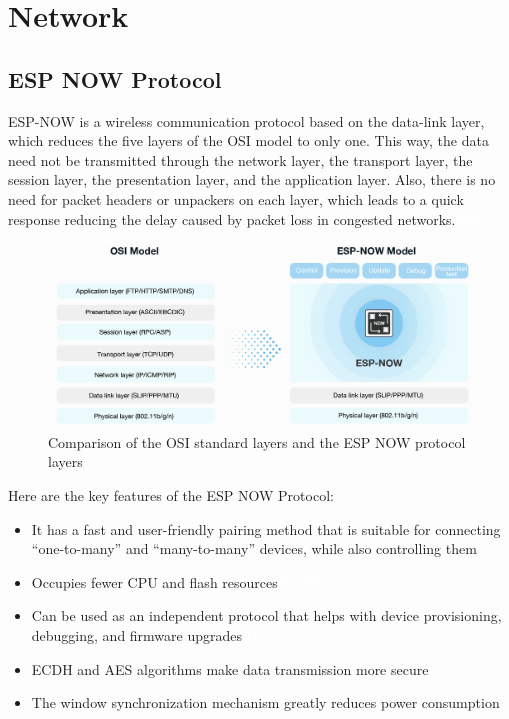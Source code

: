 \section{Network}
\subsection{ESP NOW Protocol}
ESP-NOW is a wireless communication protocol based on the data-link layer, which reduces the five layers of the \gls{OSI model} to only one. This way, the data need not be transmitted through the network layer, the transport layer, the session layer, the presentation layer, and the application layer. Also, there is no need for packet headers or unpackers on each layer, which leads to a quick response reducing the delay caused by packet loss in congested networks.{\tiny \textcolor{white}{\ac{OSI}}}
\begin{figure}[H]
    \centering
    \includegraphics[width=0.75\linewidth]{Files/Images/model-en.png}
    \caption{Comparison of the OSI standard layers and the ESP NOW protocol layers}
    \label{fig:enter-label}
\end{figure}
Here are the key features of the ESP NOW Protocol:
\begin{itemize}
    \item It has a fast and user-friendly pairing method that is suitable for connecting “one-to-many” and “many-to-many” devices, while also controlling them
    \item Occupies fewer CPU and flash resources{\tiny \textcolor{white}{\ac{ECDH}}}
    \item Can be used as an independent protocol that helps with device provisioning, debugging, and firmware upgrades{\tiny \textcolor{white}{\ac{AES}}}
    \item  \gls{ECDH} and \gls{AES}  algorithms make data transmission more secure
    \item The window synchronization mechanism greatly reduces power consumption
\end{itemize}

